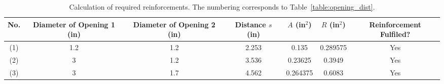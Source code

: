 \begin{table}[h]
\begin{center}
\tabcolsep=10pt
\begin{tabular}{c|c|c|c|c|c|c}
\hline
\hline
No. & \multicolumn{1}{p{2cm}|}{Diameter of Opening 1 (in)} & 
\multicolumn{1}{p{2cm}|}{Diameter of Opening 2 (in)} & 
\multicolumn{1}{p{1.4cm}|}{Distance $s$ (in)} &
$A$ (in$^2$) & $R$ (in$^2$) & \multicolumn{1}{p{2.2cm}}{Reinforcement Fulfiled?} \\
\hline
(1) & 1.2 & 1.2 & 2.253 & 0.135 & 0.289575 & Yes \\
(2) & 3 & 1.2 & 3.536 & 0.23625 & 0.3949   & Yes \\
(3) & 3 & 1.7 & 4.562 & 0.264375 & 0.6083  & Yes \\
\hline
\hline
\end{tabular}
\caption{Calculation of required reinforcements.  The numbering 
corresponds to Table~\ref{table:opening_dist}. }
\label{table:opening_reinforcement}
\end{center}
\end{table}
